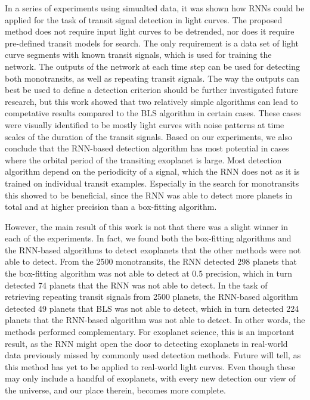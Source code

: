 
In a series of experiments using simualted data, it was shown how RNNs could be applied for the task of transit signal detection in light curves. The proposed method does not require input light curves to be detrended, nor does it require pre-defined transit models for search. The only requirement is a data set of light curve segments with known transit signals, which is used for training the network. The outputs of the network at each time step can be used for detecting both monotransits, as well as repeating transit signals. The way the outputs can best be used to define a detection criterion should be further investigated future research, but this work showed that two relatively simple algorithms can lead to competative results compared to the BLS algorithm in certain cases. These cases were visually identified to be mostly light curves with noise patterns at time scales of the duration of the transit signals. Based on our experiments, we also conclude that the RNN-based detection algorithm has most potential in cases where the orbital period of the transiting exoplanet is large. Most detection algorithm depend on the periodicity of a signal, which the RNN does not as it is trained on individual transit examples. Especially in the search for monotransits this showed to be beneficial, since the RNN was able to detect more planets in total and at higher precision than a box-fitting algorithm. 

However, the main result of this work is not that there was a slight winner in each of the experiments. In fact, we found both the box-fitting algorithms and the RNN-based algorithms to detect exoplanets that the other methods were not able to detect. From the 2500 monotransits, the RNN detected 298 planets that the box-fitting algorithm was not able to detect at 0.5 precision, which in turn detected 74 planets that the RNN was not able to detect. In the task of retrieving repeating transit signals from 2500 planets, the RNN-based algorithm detected 49 planets that BLS was not able to detect, which in turn detected 224 planets that the RNN-based algorithm was not able to detect. In other words, the methods performed complementary. For exoplanet science, this is an important result, as the RNN might open the door to detecting exoplanets in real-world data previously missed by commonly used detection methods. Future will tell, as this method has yet to be applied to real-world light curves. Even though these may only include a handful of exoplanets, with every new detection our view of the universe, and our place therein, becomes more complete.